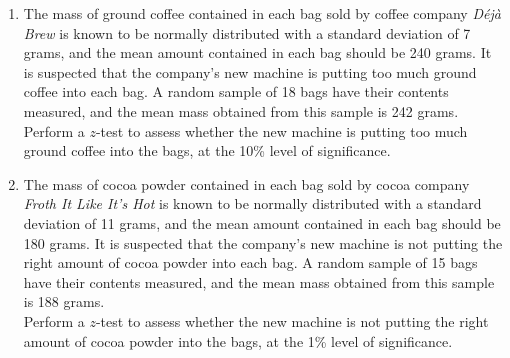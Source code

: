 \documentclass[
  11pt,
]{book}
\begin{document}
\begin{enumerate}
\begin{tcolorbox}[colback=white,colframe=black!50]
\end{tcolorbox}
The hypotheses given by the student lack the required clarity.
\begin{enumerate}
    \item State suitable hypotheses which should be used instead.
\end{enumerate}
The $p$-value of 0.3085 calculated by the student is correct, but the student has not shown sufficient working.
\begin{enumerate}[resume]
    \item Show a minimum of two additional steps of working, which lead to the value of 0.3085.
\end{enumerate}
Modern statisticians (and Advanced Higher Statistics students) must avoid using the outdated phrase '\textit{accept} $\textit{H}_\text{0}$', since it suggests the sample provides evidence \textit{for} the null hypothesis.
\begin{enumerate}[resume]
    \item State an appropriate phrase to use instead of '\textit{accept} $\textit{H}_\text{0}$'.
\end{enumerate}
The final sentence in the student's conclusion is missing an important word.
\begin{enumerate}[resume]
    \item State the essential word which is missing.
\end{enumerate}
    \item The mass of ground coffee contained in each bag sold by coffee company \textit{Déjà Brew} is known to be normally distributed with a standard deviation of 7 grams, and the mean amount contained in each bag should be 240 grams. It is suspected that the company's new machine is putting too much ground coffee into each bag. A random sample of 18 bags have their contents measured, and the mean mass obtained from this sample is 242 grams.\\[0.5em] Perform a $z$-test to assess whether the new machine is putting too much ground coffee into the bags, at the 10\% level of significance.
    \item The mass of cocoa powder contained in each bag sold by cocoa company \textit{Froth It Like It's Hot} is known to be normally distributed with a standard deviation of 11 grams, and the mean amount contained in each bag should be 180 grams. It is suspected that the company's new machine is not putting the right amount of cocoa powder into each bag. A random sample of 15 bags have their contents measured, and the mean mass obtained from this sample is 188 grams.\\[0.5em] Perform a $z$-test to assess whether the new machine is not putting the right amount of cocoa powder into the bags, at the 1\% level of significance.
\end{enumerate}
\end{document}
